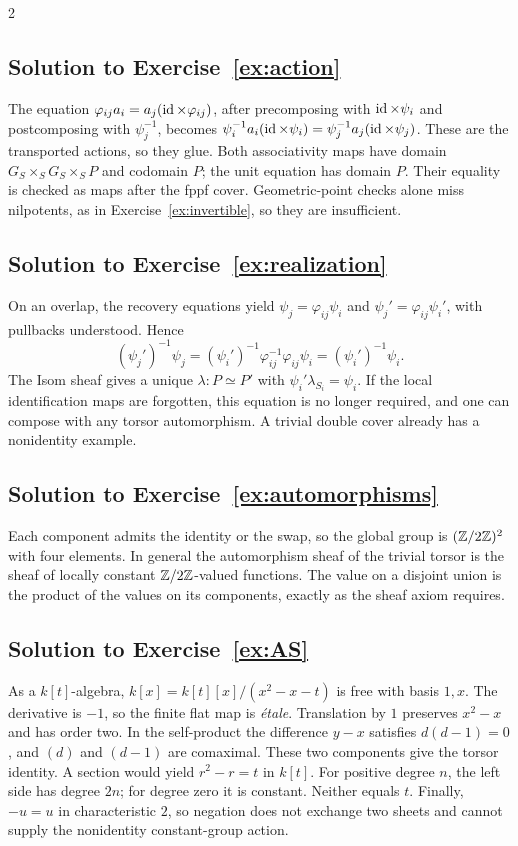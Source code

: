 \documentclass[12pt]{memoir}
\newcommand{\BGsolution}[1]{\subsection*{Solution to Exercise~\ref{#1}}\label{sol:#1}}
\begin{document}
\begin{multicols}{2}
\BGsolution{ex:action}
The equation $\varphi_{ij}a_i=a_j(\operatorname{id}\times\varphi_{ij})$, after
precomposing with $\operatorname{id}\times\psi_i$ and postcomposing with
$\psi_j^{-1}$, becomes
$\psi_i^{-1}a_i(\operatorname{id}\times\psi_i)
=\psi_j^{-1}a_j(\operatorname{id}\times\psi_j)$. These are the transported actions,
so they glue. Both associativity maps have domain
$G_S\times_S G_S\times_S P$ and codomain $P$; the unit equation has
domain $P$. Their equality is checked as maps after the fppf cover.
Geometric-point checks alone miss nilpotents, as in
Exercise~\ref{ex:invertible}, so they are insufficient.

\BGsolution{ex:realization}
On an overlap, the recovery equations yield
$\psi_j=\varphi_{ij}\psi_i$ and
$\psi_j'=\varphi_{ij}\psi_i'$, with pullbacks understood. Hence
\[
 (\psi_j')^{-1}\psi_j
 =(\psi_i')^{-1}\varphi_{ij}^{-1}\varphi_{ij}\psi_i
 =(\psi_i')^{-1}\psi_i.
\]
The Isom sheaf gives a unique $\lambda:P\simeq P'$ with
$\psi_i'\lambda_{S_i}=\psi_i$. If the local identification maps are
forgotten, this equation is no longer required, and one can compose
with any torsor automorphism. A trivial double cover already has a
nonidentity example.

\BGsolution{ex:automorphisms}
Each component admits the identity or the swap, so the global group is
$(\mathbb{Z}/2\mathbb{Z})^2$ with four elements. In general the automorphism sheaf
of the trivial torsor is the sheaf of locally constant
$\mathbb{Z}/2\mathbb{Z}$-valued functions. The value on a disjoint union is the
product of the values on its components, exactly as the sheaf axiom
requires.

\BGsolution{ex:AS}
As a $k[t]$-algebra, $k[x]=k[t][x]/(x^2-x-t)$ is free with basis $1,x$.
The derivative is $-1$, so the finite flat map is \emph{\'etale}.
Translation by $1$ preserves $x^2-x$ and has order two. In the
self-product the difference $y-x$ satisfies $d(d-1)=0$, and $(d)$ and
$(d-1)$ are comaximal. These two components give the torsor identity.
A section would yield $r^2-r=t$ in $k[t]$. For positive degree $n$, the
left side has degree $2n$; for degree zero it is constant. Neither equals
$t$. Finally, $-u=u$ in characteristic $2$, so negation does not
exchange two sheets and cannot supply the nonidentity constant-group
action.


\end{multicols}
\end{document}

